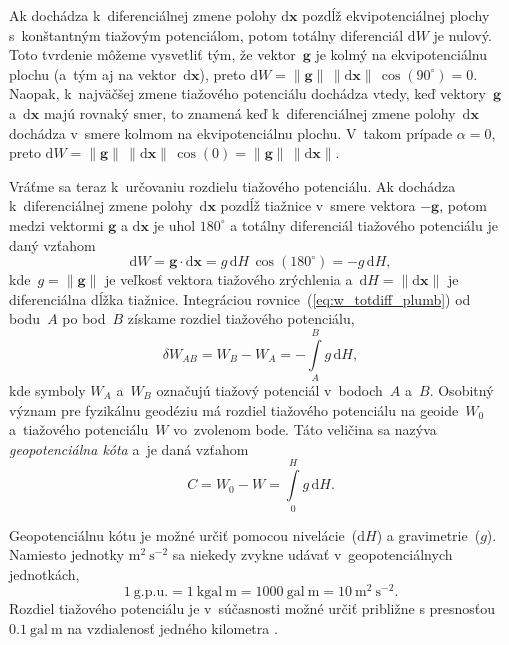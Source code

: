 \documentclass[a4paper,12pt]{book}
\newcommand{\diff}{\mathrm d}
\let\vec\mathbf
\begin{document}
Ak dochádza k~diferenciálnej zmene polohy $\diff \vec x$ pozdĺž 
ekvipotenciálnej plochy s~konštantným tiažovým potenciálom, potom totálny 
diferenciál $\diff W$ je nulový.  Toto tvrdenie môžeme vysvetliť tým, že 
vektor~$\vec g$ je kolmý na ekvipotenciálnu plochu (a~tým aj na vektor~$\diff 
\vec x$), preto $\diff W = \| \vec g \| \, \| \diff \vec x \| \, 
\cos(90^{\circ}) = 0$.  Naopak, k~najväčšej zmene tiažového potenciálu dochádza 
vtedy, keď vektory~$\vec g$ a~$\diff \vec x$ majú rovnaký smer, to znamená keď 
k~diferenciálnej zmene polohy~$\diff \vec x$ dochádza v~smere kolmom na 
ekvipotenciálnu plochu.  V~takom prípade $\alpha = 0$, preto $\diff W = \| \vec 
g \| \, \| \diff \vec x \| \, \cos(0) = \| \vec g \| \, \| \diff \vec x \|$.

Vráťme sa teraz k~určovaniu rozdielu tiažového potenciálu.  Ak dochádza 
k~diferenciálnej zmene polohy~$\diff \vec x$ pozdĺž tiažnice v~smere vektora 
$-\vec g$, potom medzi vektormi $\vec g$ a $\diff \vec x$ je uhol $180^{\circ}$ 
a totálny diferenciál tiažového potenciálu je daný vzťahom
%
\begin{equation}
\label{eq:w_totdiff_plumb}
\diff W = \vec g \cdot \diff \vec x = g \, \diff H \, \cos(180^{\circ}) = -g \, 
\diff H{,}
\end{equation}
%
kde~$g = \| \vec g \|$ je veľkosť vektora tiažového zrýchlenia a~$\diff H = \| 
\diff \vec x \|$ je diferenciálna dĺžka tiažnice.  Integráciou 
rovnice~(\ref{eq:w_totdiff_plumb}) od bodu~$A$ po bod~$B$ získame rozdiel 
tiažového potenciálu,
%
\begin{equation}
\label{eq:w_ab}
\delta W_{AB} = W_B - W_A = -\int\limits_{A}^{B} g \, \diff H{,}
\end{equation}
%
kde symboly $W_A$ a~$W_B$ označujú tiažový potenciál v~bodoch~$A$ a~$B$.  
Osobitný význam pre fyzikálnu geodéziu má rozdiel tiažového potenciálu na 
geoide~$W_0$ a~tiažového potenciálu~$W$ vo~zvolenom bode.  Táto veličina sa 
nazýva \emph{geopotenciálna kóta} a~je daná vzťahom
%
\begin{equation}
\label{eq:geopotential_number}
C = W_0 - W = \int\limits_0^H g \, \diff H{.}
\end{equation}

Geopotenciálnu kótu je možné určiť pomocou nivelácie~($\diff H$) 
a gravimetrie~($g$).  Namiesto jednotky $\mathrm{m}^2\ \mathrm{s}^{-2}$ sa 
niekedy zvykne udávať v~geopotenciálnych jednotkách,
%
\begin{equation}
\label{eq:gpu_unit}
1\ \mathrm{g.p.u.} = 1\ \mathrm{kgal} \ \mathrm{m} = 1000\ \mathrm{gal}\ 
\mathrm{m} = 10\ \mathrm{m}^2 \ \mathrm{s}^{-2}{.}
\end{equation}
%
Rozdiel tiažového potenciálu je v~súčasnosti možné určiť približne s presnosťou 
$0.1\ \mathrm{gal} \ \mathrm{m}$ na vzdialenosť jedného kilometra 
\parencite{MoritzPhysicalGeodesy}.
\end{document}
